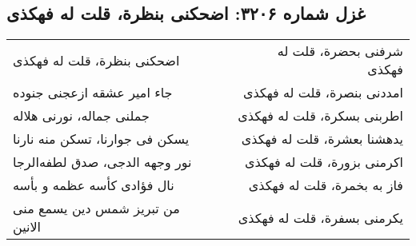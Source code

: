 \begin{center}
\section*{غزل شماره ۳۲۰۶: اضحکنی بنظرة، قلت له فهکذی}
\label{sec:3206}
\begin{longtable}{l p{0.5cm} r}
اضحکنی بنظرة، قلت له فهکذی
&&
شرفنی بحضرة، قلت له فهکذی
\\
جاء امیر عشقه ازعجنی جنوده
&&
امددنی بنصرة، قلت له فهکذی
\\
جملنی جماله، نورنی هلاله
&&
اطربنی بسکرة، قلت له فهکذی
\\
یسکن فی جوارنا، تسکن منه نارنا
&&
یدهشنا بعشرة، قلت له فهکذی
\\
نور وجهه الدجی، صدق لطفه‌الرجا
&&
اکرمنی بزورة، قلت له فهکذی
\\
نال فؤادی کأسه عظمه و بأسه
&&
فاز به بخمرة، قلت له فهکذی
\\
من تبریز شمس دین یسمع منی الانین
&&
یکرمنی بسفرة، قلت له فهکذی
\\
\end{longtable}
\end{center}
